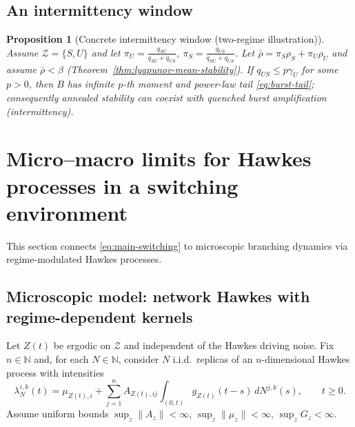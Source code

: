 \documentclass[12pt,a4paper]{article}
\theoremstyle{plain}
\newtheorem{proposition}[theorem]{Proposition}
\theoremstyle{definition}
\theoremstyle{remark}
\begin{document}
\subsection{An intermittency window}
\label{subsec:intermittency-window}
\label{subsec:intermittency-defs}


\begin{proposition}[Concrete intermittency window (two-regime illustration)]
	\label{prop:intermittency-window-2reg}
	Assume $\mathcal Z=\{S,U\}$ and let
	$\pi_U=\frac{q_{SU}}{q_{SU}+q_{US}}$, $\pi_S=\frac{q_{US}}{q_{SU}+q_{US}}$.
	Let $\bar\rho=\pi_S\rho_S+\pi_U\rho_U$ and assume $\bar\rho<\beta$ (Theorem~\ref{thm:lyapunov-mean-stability}).
	If $q_{US}\le p\gamma_U$ for some $p>0$, then $B$ has infinite $p$-th moment and power-law tail
	\eqref{eq:burst-tail}; consequently annealed stability can coexist with quenched burst amplification
	(intermittency).
\end{proposition}

\section{Micro--macro limits for Hawkes processes in a switching environment}
\label{sec:micro-macro}
\label{sec:micro-macro-random} 

This section connects \eqref{eq:main-switching} to microscopic branching dynamics via
regime-modulated Hawkes processes.

\subsection{Microscopic model: network Hawkes with regime-dependent kernels}
\label{subsec:hawkes-model}

Let $Z(t)$ be ergodic on $\mathcal Z$ and independent of the Hawkes driving noise.
Fix $n\in\mathbb N$ and, for each $N\in\mathbb N$, consider $N$ i.i.d.\ replicas of an
$n$-dimensional Hawkes process with intensities
\begin{equation}
	\label{eq:hawkes-random-intensity}
	\lambda^{i,k}_N(t)
	=
	\mu_{Z(t),i}
	+
	\sum_{j=1}^n A_{Z(t),ij}\int_{(0,t)} g_{Z(t)}(t-s)\,dN^{j,k}(s),
	\qquad t\ge 0.
\end{equation}
Assume uniform bounds $\sup_z\|A_z\|<\infty$, $\sup_z\|\mu_z\|<\infty$, $\sup_z G_z<\infty$.
\end{document}

